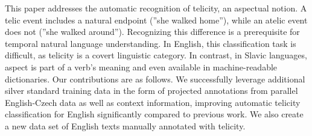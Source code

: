 This paper addresses the automatic recognition of telicity, an aspectual notion. A telic event includes a natural endpoint (''she walked home''), while an atelic event does not (''she walked around''). Recognizing this difference is a prerequisite for temporal natural language understanding. In English, this classification task is difficult, as telicity is a covert linguistic category. In contrast, in Slavic languages, aspect is part of a verb's meaning and even available in machine-readable dictionaries. Our contributions are as follows. We successfully leverage additional silver standard training data in the form of projected annotations from parallel English-Czech data as well as context information, improving automatic telicity classification for English significantly compared to previous work. We also create a new data set of English texts manually annotated with telicity.
